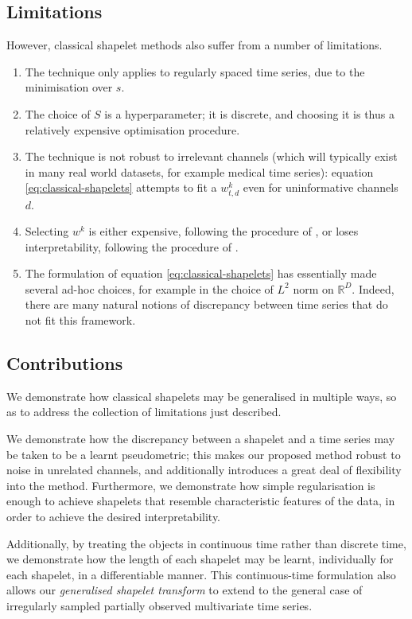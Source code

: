 \documentclass{article}
\theoremstyle{plain}
\theoremstyle{definition}
\newcommand{\reals}{\mathbb{R}}
\begin{document}
	\subsection{Limitations}
	However, classical shapelet methods also suffer from a number of limitations.
	\begin{enumerate}
	\item The technique only applies to regularly spaced time series, due to the minimisation over $s$. 
	\item The choice of $S$ is a hyperparameter; it is discrete, and choosing it is thus a relatively expensive optimisation procedure.
	\item The technique is not robust to irrelevant channels (which will typically exist in many real world datasets, for example medical time series): equation \eqref{eq:classical-shapelets} attempts to fit a $w^{k}_{t, d}$ even for uninformative channels $d$.
	\item Selecting $w^{k}$ is either expensive, following the procedure of \cite{TODO}, or loses interpretability, following the procedure of \cite{TODO}.  %
	\item The formulation of equation \eqref{eq:classical-shapelets} has essentially made several ad-hoc choices, for example in the choice of $L^2$ norm on $\reals^D$. Indeed, there are many natural notions of discrepancy between time series \cite{TODO, TODO, TODO, TODO} that do not fit this framework.
	\end{enumerate}
	
	\subsection{Contributions}
	We demonstrate how classical shapelets may be generalised in multiple ways, so as to address the collection of limitations just described.
	
	We demonstrate how the discrepancy between a shapelet and a time series may be taken to be a learnt pseudometric; this makes our proposed method robust to noise in unrelated channels, and additionally introduces a great deal of flexibility into the method. Furthermore, we demonstrate how simple regularisation is enough to achieve shapelets that resemble characteristic features of the data, in order to achieve the desired interpretability.
	
	Additionally, by treating the objects in continuous time rather than discrete time, we demonstrate how the length of each shapelet may be learnt, individually for each shapelet, in a differentiable manner. This continuous-time formulation also allows our \emph{generalised shapelet transform} to extend to the general case of irregularly sampled partially observed multivariate time series.
	
\end{document}
